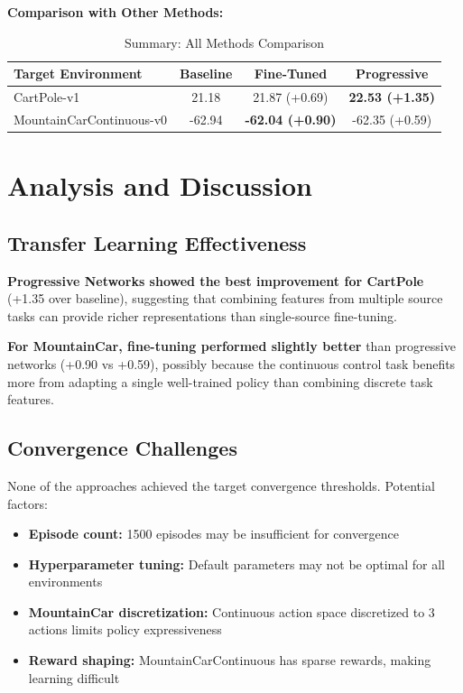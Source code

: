 \documentclass[11pt,a4paper]{article}
\begin{document}
\textbf{Comparison with Other Methods:}

\begin{table}[H]
\centering
\caption{Summary: All Methods Comparison}
\begin{tabular}{lccc}
\toprule
\textbf{Target Environment} & \textbf{Baseline} & \textbf{Fine-Tuned} & \textbf{Progressive} \\
\midrule
CartPole-v1 & 21.18 & 21.87 (+0.69) & \textbf{22.53 (+1.35)} \\
MountainCarContinuous-v0 & -62.94 & \textbf{-62.04 (+0.90)} & -62.35 (+0.59) \\
\bottomrule
\end{tabular}
\end{table}

\section{Analysis and Discussion}

\subsection{Transfer Learning Effectiveness}

\textbf{Progressive Networks showed the best improvement for CartPole} (+1.35 over baseline), suggesting that combining features from multiple source tasks can provide richer representations than single-source fine-tuning.

\textbf{For MountainCar, fine-tuning performed slightly better} than progressive networks (+0.90 vs +0.59), possibly because the continuous control task benefits more from adapting a single well-trained policy than combining discrete task features.

\subsection{Convergence Challenges}

None of the approaches achieved the target convergence thresholds. Potential factors:
\begin{itemize}
    \item \textbf{Episode count:} 1500 episodes may be insufficient for convergence
    \item \textbf{Hyperparameter tuning:} Default parameters may not be optimal for all environments
    \item \textbf{MountainCar discretization:} Continuous action space discretized to 3 actions limits policy expressiveness
    \item \textbf{Reward shaping:} MountainCarContinuous has sparse rewards, making learning difficult
\end{itemize}
\end{document}
